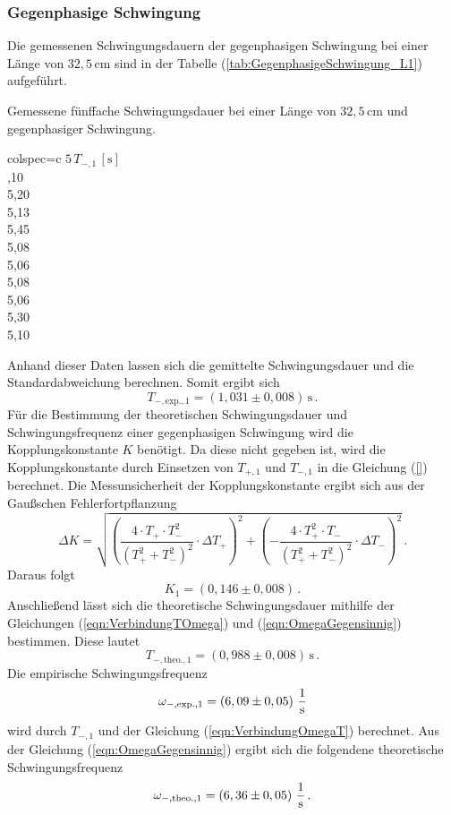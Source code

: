 \subsubsection{Gegenphasige Schwingung}
\label{sec:GegenphasigeSchwingung_KurzelPendel}
Die gemessenen Schwingungsdauern der gegenphasigen Schwingung bei einer Länge von $32,5\, \unit{\centi\meter}$ sind 
in der Tabelle (\ref{tab:GegenphasigeSchwingung_L1}) aufgeführt. 
\begin{table}[H]
  \centering
  \caption{Gemessene fünffache Schwingungsdauer bei einer Länge von $32,5\, \unit{\centi\meter}$ und gegenphasiger Schwingung.}
  \label{tab:GegenphasigeSchwingung_L1}
  \begin{tblr}{colspec={c}}
      \toprule
      $5\, T_{-, 1}\,\left[\unit{\second}\right]$\\
      ,10 \\
      5,20 \\
      5,13 \\
      5,45 \\
      5,08 \\
      5,06 \\
      5,08 \\
      5,06 \\
      5,30 \\
      5,10 \\
      \bottomrule
  \end{tblr}
\end{table}
Anhand dieser Daten lassen sich die gemittelte Schwingungsdauer und die Standardabweichung berechnen. Somit ergibt sich
$$T_{-,\text{exp.}, 1} = \left(1,031 \pm 0,008 \right)\, \unit{\second}\,.$$ 
Für die Bestimmung der theoretischen Schwingungsdauer und Schwingungsfrequenz einer gegenphasigen Schwingung wird die Kopplungskonstante $K$ benötigt. Da
diese nicht gegeben ist, wird die Kopplungskonstante durch Einsetzen von $T_{+,1}$ und $T_{-,1}$ in die Gleichung (\ref{}) berechnet. Die Messunsicherheit der Kopplungskonstante
ergibt sich aus der Gaußschen Fehlerfortpflanzung
$$\Delta K = \sqrt{\left(\frac{4 \cdot T_+\cdot T_{-}^{2}}{\left(T_{+}^{2} + T_{-}^{2}\right)^{2}}\cdot \Delta T_+\right)^{2}+ \left(-\frac{4\cdot T_{+}^{2}\cdot T_{-}}{\left(T_{+}^{2} + T_{-}^{2}\right)^{2}} \cdot \Delta T_{-}\right)^2}\,.$$
Daraus folgt
$$K_1 = \left( 0,146 \pm 0,008 \right)\,.$$
Anschließend lässt sich die theoretische Schwingungsdauer mithilfe der Gleichungen (\ref{eqn:VerbindungTOmega}) und (\ref{eqn:OmegaGegensinnig}) bestimmen. Diese lautet
$$T_{-,\text{theo.},1} = \left( 0,988 \pm 0,008 \right)\, \unit{\second}\,.$$
Die empirische Schwingungsfrequenz 
$$\omega_{-,\text{exp.},1} = \left( 6,09 \pm 0,05 \right)\, \unit[per-mode=fraction]{\per \second}$$ wird durch $T_{-,1}$ und der Gleichung (\ref{eqn:VerbindungOmegaT})
berechnet. Aus der Gleichung (\ref{eqn:OmegaGegensinnig}) ergibt sich die folgendene theoretische Schwingungsfrequenz
$$\omega_{-,\text{theo.},1} = \left( 6,36 \pm 0,05 \right)\,\unit[per-mode=fraction]{\per \second}\,.$$
%
%
